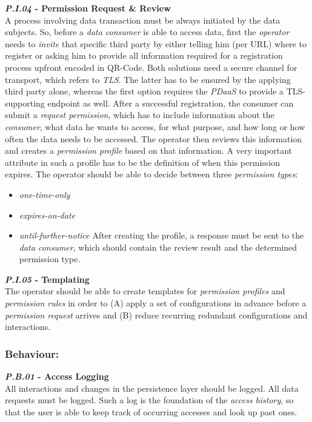 \documentclass[12pt,english,a4paper,titlepage,cleardoublepage=empty,dottedtoc]{report}
\providecommand{\tightlist}{%
  \setlength{\itemsep}{0pt}\setlength{\parskip}{0pt}}
\begin{document}
\textbf{\emph{\protect\hypertarget{pi04}{}{P.I.04}} - Permission Request
\& Review}\\
A process involving data transaction must be always initiated by the
data subjects. So, before a \emph{data consumer} is able to access data,
first the \emph{operator} needs to \emph{invite} that specific third
party by either telling him (per URL) where to register or asking him to
provide all information required for a registration process upfront
encoded in QR-Code. Both solutions need a secure channel for transport,
which refers to \emph{TLS}. The latter has to be ensured by the applying
third party alone, whereas the first option requires the \emph{PDaaS} to
provide a TLS-supporting endpoint as well. After a successful
registration, the consumer can submit a \emph{request permission}, which
has to include information about the \emph{consumer}, what data he wants
to access, for what purpose, and how long or how often the data needs to
be accessed. The operator then reviews this information and creates a
\emph{permission profile} based on that information. A very important
attribute in such a profile has to be the definition of when this
permission expires. The operator should be able to decide between three
\emph{permission types}:

\begin{itemize}
\tightlist
\item
  \emph{one-time-only}
\item
  \emph{expires-on-date}
\item
  \emph{until-further-notice} After creating the profile, a response
  must be sent to the \emph{data consumer}, which should contain the
  review result and the determined permission type.
\end{itemize}

\textbf{\emph{\protect\hypertarget{pi05}{}{P.I.05}} - Templating}\\
The operator should be able to create templates for \emph{permission
profiles} and \emph{permission rules} in order to (A) apply a set of
configurations in advance before a \emph{permission request} arrives and
(B) reduce recurring redundant configurations and interactions.

\subsubsection*{Behaviour:}\label{behaviour}

\textbf{\emph{\protect\hypertarget{pb01}{}{P.B.01}} - Access Logging}\\
All interactions and changes in the persistence layer should be logged.
All data requests must be logged. Such a log is the foundation of the
\emph{access history}, so that the user is able to keep track of
occurring accesses and look up past ones.
\end{document}
